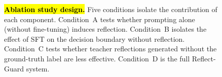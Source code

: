 \documentclass[superintelligence,article,accept,moreauthors]{Definitions/mdpi}
\begin{document}
\begin{figure}[H]
{}%
\caption{\textbf{\hl{Ablation study design.} %
}
Five conditions isolate the contribution of each component.
Condition~A tests whether prompting alone (without fine-tuning) induces reflection.
Condition~B isolates the effect of SFT on the decision boundary without reflection.
Condition~C tests whether teacher reflections generated without the ground-truth label are less effective.
Condition~D is the full Reflect-Guard system.\label{fig:ablation}}
\end{figure}






\vspace{-6pt}
\end{document}
